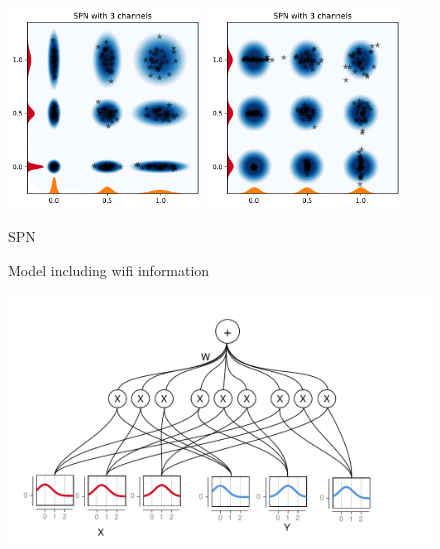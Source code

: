 \begin{figure}[H]%
    \centering
    {\includegraphics[width=0.46\textwidth]{Pictures/SPN_illustration1.pdf} }%
    \qquad
   {\includegraphics[width=0.46\textwidth]{Pictures/SPN_illustration2.pdf} }%
    \caption{SPN}%
    \label{SPN_fig}%
\end{figure}

\begin{figure}[htbp]
    \centering
    
    \caption{Model including wifi information}
    \label{fig:wifi2}
\end{figure}

\begin{figure}[H]
    \centering
    \includegraphics[width=\textwidth]{Figures/SPN_graph2.pdf}
\end{figure}


